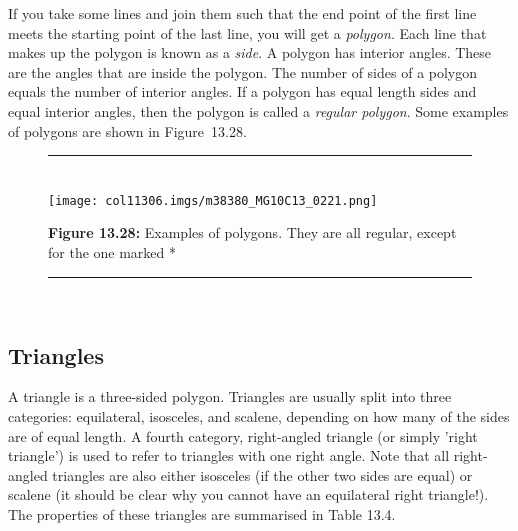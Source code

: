 \begin{table}[H]
      \label{m38380*id317435}If you take some lines and join them such that the end point of the first line meets the starting point of the last line, you will get a \textsl{polygon}. Each line that makes up the polygon is known as a \textsl{side}. A polygon has interior angles. These are the angles that are inside the polygon. The number of sides of a polygon equals the number of interior angles. If a polygon has equal length sides and equal interior angles, then the polygon is called a \textsl{regular polygon}. Some examples of polygons are shown in Figure~13.28.\par 
      
    \setcounter{subfigure}{0}


	\begin{figure}[H] %
    \begin{center}
    \rule[.1in]{\figurerulewidth}{.005in} \\
        \label{m38380*uid37!!!underscore!!!media}\label{m38380*uid37!!!underscore!!!printimage}\texttt{[image: col11306.imgs/m38380\_MG10C13\_0221.png]} %
        
      \vspace{2pt}
    \vspace{\rubberspace}\par \begin{cnxcaption}
	  \small \textbf{Figure 13.28: }Examples of polygons. They are all regular, except for the one marked *
	\end{cnxcaption}
      
    \vspace{.1in}
    \rule[.1in]{\figurerulewidth}{.005in} \\
        
    \end{center}

 \end{figure}   

    \addtocounter{footnote}{-0}
\vspace{-1cm}    
      \label{m38380*uid38}
        \subsection{ Triangles}
        \nopagebreak
        \label{m38380*id317485}A triangle is a three-sided polygon. Triangles are usually split into three categories: equilateral, isosceles, and scalene, depending on how many of the sides are of equal length. A fourth category, right-angled triangle (or simply 'right triangle') is used to refer to triangles with one right angle. Note that all right-angled triangles are also either isosceles (if the other two sides are equal) or scalene (it should be clear why you cannot have an equilateral right triangle!). The properties of these triangles are summarised in Table 13.4.\par 
        

\end{table}
